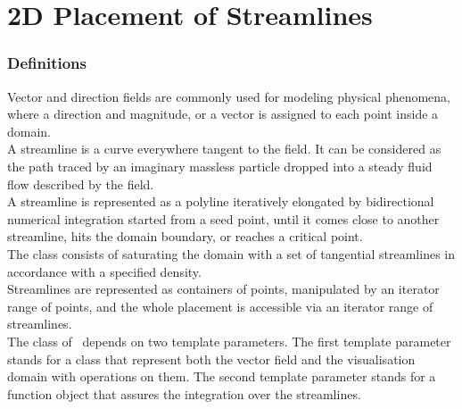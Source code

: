 
\chapter{2D Placement of Streamlines}
\label{ref_chapter_2D_Streamlines}


\subsection*{Definitions}
Vector and direction fields are commonly used for modeling physical
phenomena, where a direction and magnitude, or a vector is assigned to
each point inside a domain.\\ A streamline is a curve everywhere
tangent to the field. It can be considered as the path traced by an
imaginary massless particle dropped into a steady fluid flow described
by the field.\\ A streamline is represented as a polyline iteratively
elongated by bidirectional numerical integration started from a seed
point, until it comes close to another streamline, hits the domain
boundary, or reaches a critical point.\\ The  class consists
of saturating the domain with a set of tangential streamlines in
accordance with a specified density.\\ Streamlines are represented as
containers of points, manipulated by an iterator range of points, and the
whole placement is accessible via an iterator range of streamlines.\\ The
 class of \cgal\ depends on two
template parameters.  The first template parameter stands for a class that
represent both the
vector field and the visualisation domain with operations on them.
The second template parameter stands for a function object that assures
the integration over the streamlines.

